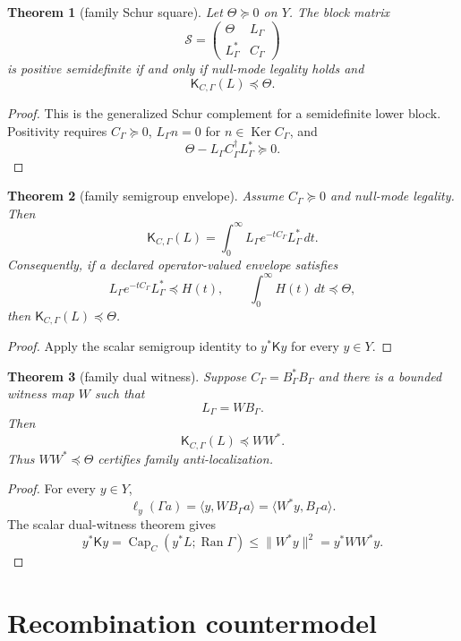 \documentclass[11pt]{article}
\newtheorem{theorem}{Theorem}[section]
\newcommand{\Capa}{\operatorname{Cap}}
\newcommand{\Ran}{\operatorname{Ran}}
\newcommand{\Ker}{\operatorname{Ker}}
\newcommand{\Kmat}{\mathsf K}
\begin{document}
\begin{theorem}[family Schur square]
Let $\Theta\succeq0$ on $Y$.  The block matrix
\[
\mathcal S=\begin{pmatrix}
\Theta & L_\Gamma\\
L_\Gamma^* & C_\Gamma
\end{pmatrix}
\]
is positive semidefinite if and only if null-mode legality holds and
\[
\boxed{\Kmat_{C,\Gamma}(L)\preceq\Theta.}
\]
\end{theorem}

\begin{proof}
This is the generalized Schur complement for a semidefinite lower block.  Positivity requires $C_\Gamma\succeq0$, $L_\Gamma n=0$ for $n\in\Ker C_\Gamma$, and
\[
\Theta-L_\Gamma C_\Gamma^\dagger L_\Gamma^*\succeq0.
\]
\end{proof}

\begin{theorem}[family semigroup envelope]
Assume $C_\Gamma\succeq0$ and null-mode legality.  Then
\[
\boxed{\Kmat_{C,\Gamma}(L)=\int_0^\infty L_\Gamma e^{-tC_\Gamma}L_\Gamma^*\,dt.}
\]
Consequently, if a declared operator-valued envelope satisfies
\[
L_\Gamma e^{-tC_\Gamma}L_\Gamma^*\preceq H(t),
\qquad
\int_0^\infty H(t)\,dt\preceq\Theta,
\]
then $\Kmat_{C,\Gamma}(L)\preceq\Theta$.
\end{theorem}

\begin{proof}
Apply the scalar semigroup identity to $y^*\Kmat y$ for every $y\in Y$.
\end{proof}

\begin{theorem}[family dual witness]
Suppose $C_\Gamma=B_\Gamma^*B_\Gamma$ and there is a bounded witness map $W$ such that
\[
L_\Gamma=WB_\Gamma.
\]
Then
\[
\boxed{\Kmat_{C,\Gamma}(L)\preceq WW^*.}
\]
Thus $WW^*\preceq\Theta$ certifies family anti-localization.
\end{theorem}

\begin{proof}
For every $y\in Y$,
\[
\ell_y(\Gamma a)=\langle y,WB_\Gamma a\rangle=\langle W^*y,B_\Gamma a\rangle.
\]
The scalar dual-witness theorem gives
\[
y^*\Kmat y=\Capa_C(y^*L;\Ran\Gamma)\le\|W^*y\|^2=y^*WW^*y.
\]
\end{proof}

\section{Recombination countermodel}
\end{document}
